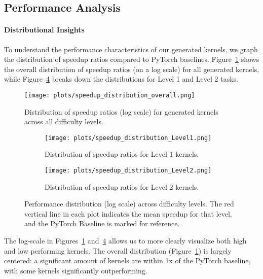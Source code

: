 \documentclass{article}
\begin{document}
\subsection{Performance Analysis}

\paragraph{Distributional Insights} To understand the performance characteristics of our generated kernels, we graph the distribution of speedup ratios compared to PyTorch baselines. Figure~\ref{fig:overall_speedup} shows the overall distribution of speedup ratios (on a log scale) for all generated kernels, while Figure~\ref{fig:speedup_distributions} breaks down the distributions for Level 1 and Level 2 tasks.

\begin{figure}[htbp]
    \centering
    \texttt{[image: plots/speedup\_distribution\_overall.png]}
    \caption{Distribution of speedup ratios (log scale) for generated kernels across all difficulty levels.}
    \label{fig:overall_speedup}
\end{figure}

\begin{figure}[htbp]
    \centering
    \begin{subfigure}[b]{0.48\textwidth}
        \centering
        \texttt{[image: plots/speedup\_distribution\_Level1.png]}
        \caption{Distribution of speedup ratios for Level 1 kernels.}
        \label{fig:level1_speedup}
    \end{subfigure}
    \hfill
    \begin{subfigure}[b]{0.48\textwidth}
        \centering
        \texttt{[image: plots/speedup\_distribution\_Level2.png]}
        \caption{Distribution of speedup ratios for Level 2 kernels.}
        \label{fig:level2_speedup}
    \end{subfigure}
    \caption{Performance distribution (log scale) across difficulty levels. The red vertical line in each plot indicates the mean speedup for that level, and the PyTorch Baseline is marked for reference.}
    \label{fig:speedup_distributions}
\end{figure}
The log-scale in Figures~\ref{fig:overall_speedup} and~\ref{fig:speedup_distributions} allows us to more clearly visualize both high and low performing kernels. The overall distribution (Figure~\ref{fig:overall_speedup}) is largely centered: a significant amount of kernels are within 1x of the PyTorch baseline, with some kernels significantly outperforming.
\end{document}
